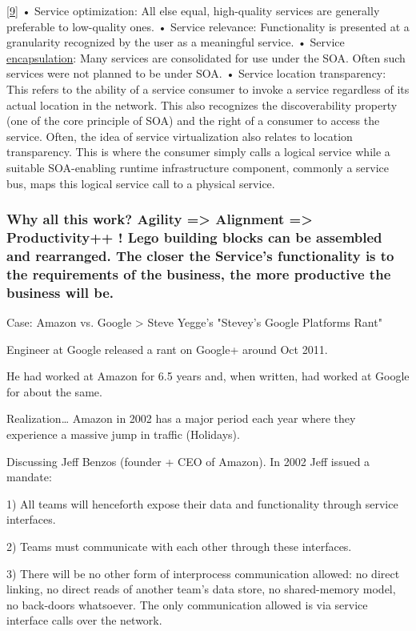 \documentclass{article}
\begin{document}
\href{http://en.wikipedia.org/wiki/Service-oriented\_architecture#cite\_note-9}{[9]}
	•	Service optimization: All else equal, high-quality services are generally preferable to low-quality ones.
	•	Service relevance: Functionality is presented at a granularity recognized by the user as a meaningful service.
	•	Service 
\href{http://en.wikipedia.org/wiki/Encapsulation\_\%28computer\_science\%29}{encapsulation}: Many services are consolidated for use under the SOA. Often such services were not planned to be under SOA.
	•	Service location transparency: This refers to the ability of a service consumer to invoke a service regardless of its actual location in the network. This also recognizes the discoverability property (one of the core principle of SOA) and the right of a consumer to access the service. Often, the idea of service virtualization also relates to location transparency. This is where the consumer simply calls a logical service while a suitable SOA-enabling runtime infrastructure component, commonly a service bus, maps this logical service call to a physical service.

\subsubsection{Why all this work? Agility => Alignment => Productivity++ !  Lego building blocks can be assembled and rearranged.  The closer the Service's functionality is to the requirements of the business, the more productive the business will be.}
Case: Amazon vs. Google > Steve Yegge's "Stevey's Google Platforms Rant"

Engineer at Google released a rant on Google+ around Oct 2011.

He had worked at Amazon for 6.5 years and, when written, had worked at Google for about the same.

Realization… Amazon in 2002 has a major period each year where they experience a massive jump in traffic (Holidays).

Discussing Jeff Benzos (founder + CEO of Amazon).  In 2002 Jeff issued a mandate:

1) All teams will henceforth expose their data and functionality through service interfaces.

2) Teams must communicate with each other through these interfaces.

3) There will be no other form of interprocess communication allowed: no direct linking, no direct reads of another team's data store, no shared-memory model, no back-doors whatsoever. The only communication allowed is via service interface calls over the network.
\end{document}
